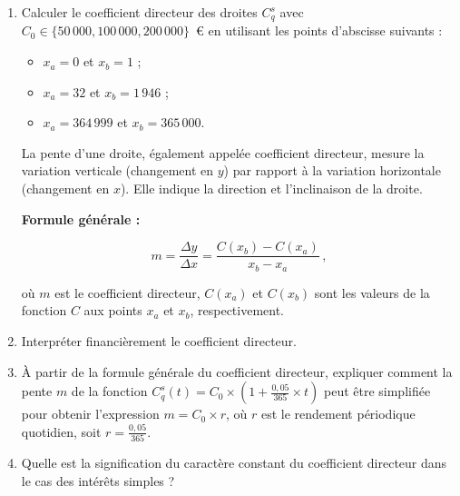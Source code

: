 \documentclass{article}
\begin{document}
\begin{enumerate}[label=\textbf{Q1.\arabic*}]
    \item Calculer le coefficient directeur des droites \( C^s_q \) avec \( C_0 \in \{50\,000, 100\,000, 200\,000\} \)~€ en utilisant les points d'abscisse suivants :
          \begin{itemize}
              \item \( x_a = 0 \) et \( x_b = 1 \) ;
              \item \( x_a = 32 \) et \( x_b = 1\,946 \) ;
              \item \( x_a = 364\,999 \) et \( x_b = 365\,000 \).
          \end{itemize}
          \begin{tcolorbox}[
                  colback=lightgreen,
                  colframe=lightgreen,
                  boxrule=0.5pt,
                  arc=0pt,
                  left=10pt,
                  right=10pt,
                  top=6pt,
                  bottom=6pt,
                  boxsep=2pt,
                  before upper={\faLightbulb\hspace{10pt}}
              ]
              La pente d'une droite, également appelée coefficient directeur, mesure la variation verticale (changement en \( y \)) par rapport à la variation horizontale (changement en \( x \)). Elle indique la direction et l'inclinaison de la droite.
                  
              \textbf{Formule générale :}
                  
              \[
                  m = \frac{\Delta y}{\Delta x} = \frac{C(x_b) - C(x_a)}{x_b - x_a}\,,
              \]
                  
              où \( m \) est le coefficient directeur, \( C(x_a) \) et \( C(x_b) \) sont les valeurs de la fonction \( C \) aux points \( x_a \) et \( x_b \), respectivement.
          \end{tcolorbox}
          
    \item Interpréter financièrement le coefficient directeur.
          
    \item À partir de la formule générale du coefficient directeur, expliquer comment la pente \( m \) de la fonction \( C_q^s(t) = C_0 \times \left(1 + \frac{0{,}05}{365} \times t\right) \) peut être simplifiée pour obtenir l'expression \( m = C_0 \times r \), où \( r \) est le rendement périodique quotidien, soit \( r = \frac{0{,}05}{365} \).
          
    \item Quelle est la signification du caractère constant du coefficient directeur dans le cas des intérêts simples ?
          

\end{enumerate}
\end{document}
